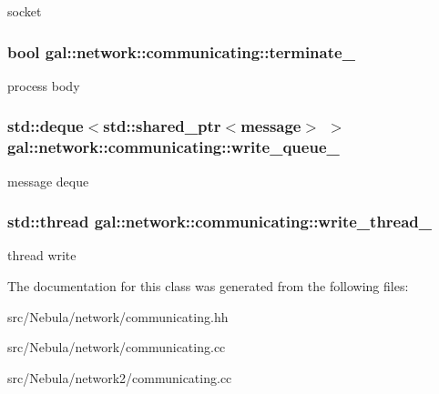socket \hypertarget{classgal_1_1network_1_1communicating_a4dc031687aa84ce7e3cca5ce9839d5d7}{
\subsubsection[{terminate\-\_\-}]{\setlength{\rightskip}{0pt plus 5cm}bool {\bf gal\-::network\-::communicating\-::terminate\-\_\-}}}\label{classgal_1_1network_1_1communicating_a4dc031687aa84ce7e3cca5ce9839d5d7}
process body \hypertarget{classgal_1_1network_1_1communicating_abc369b818849e23007089c5f7baf8924}{
\subsubsection[{write\-\_\-queue\-\_\-}]{\setlength{\rightskip}{0pt plus 5cm}std\-::deque$<$std\-::shared\-\_\-ptr$<${\bf message}$>$ $>$ {\bf gal\-::network\-::communicating\-::write\-\_\-queue\-\_\-}}}\label{classgal_1_1network_1_1communicating_abc369b818849e23007089c5f7baf8924}
message deque \hypertarget{classgal_1_1network_1_1communicating_afc83d88ea30befb842e16a5cf7d5e936}{
\subsubsection[{write\-\_\-thread\-\_\-}]{\setlength{\rightskip}{0pt plus 5cm}std\-::thread {\bf gal\-::network\-::communicating\-::write\-\_\-thread\-\_\-}}}\label{classgal_1_1network_1_1communicating_afc83d88ea30befb842e16a5cf7d5e936}
thread write 

\-The documentation for this class was generated from the following files\-:\begin{DoxyCompactItemize}
\item 
src/\-Nebula/network/communicating.\-hh\item 
src/\-Nebula/network/communicating.\-cc\item 
src/\-Nebula/network2/communicating.\-cc\end{DoxyCompactItemize}
